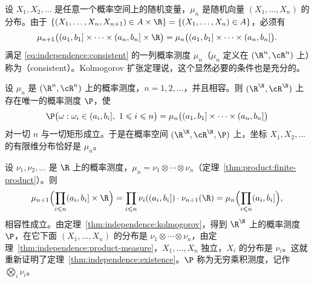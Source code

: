 设 $X_1,X_2,\dots$ 是任意一个概率空间上的随机变量，$\mu_n$ 是随机向量 $(X_1,\dots,X_n)$ 的分布。由于 $\{(X_1,\dots,X_n,X_{n+1})\in A\times\R\}=\{(X_1,\dots,X_n)\in A\}$，必须有
\begin{equation}\label{eq:independence:consistent}
\mu_{n+1}\bigl((a_1,b_1]\times\cdots\times(a_n,b_n]\times\R\bigr)=\mu_n\bigl((a_1,b_1]\times\cdots\times(a_n,b_n]\bigr).
\end{equation}
满足 \eqref{eq:independence:consistent} 的一列概率测度 $\mu_n$（$\mu_n$ 定义在 $(\R^n,\cR^n)$ 上）称为（consistent）。Kolmogorov 扩张定理说，这个显然必要的条件也是充分的。

\begin{theorem}\label{thm:independence:kolmogorov}
设 $\mu_n$ 是 $(\R^n,\cR^n)$ 上的概率测度，$n=1,2,\dots$，并且相容。则 $(\R^\N,\cR^\N)$ 上存在唯一的概率测度 $\P$，使
\[
\P\bigl(\omega:\omega_i\in(a_i,b_i],\ 1\leqslant i\leqslant n\bigr)=\mu_n\bigl((a_1,b_1]\times\cdots\times(a_n,b_n]\bigr)
\]
对一切 $n$ 与一切矩形成立。于是在概率空间 $(\R^\N,\cR^\N,\P)$ 上，坐标 $X_1,X_2,\dots$ 的有限维分布恰好是 $\mu_n$。
\end{theorem}

\begin{example}[独立序列]\label{ex:independence:kolmogorov-product}
设 $\nu_1,\nu_2,\dots$ 是 $\R$ 上的概率测度，$\mu_n=\nu_1\otimes\cdots\otimes\nu_n$（定理~\ref{thm:product:finite-product}）。则
\[
\mu_{n+1}\Bigl(\prod_{i\leqslant n}(a_i,b_i]\times\R\Bigr)=\prod_{i\leqslant n}\nu_i((a_i,b_i])\cdot\nu_{n+1}(\R)=\mu_n\Bigl(\prod_{i\leqslant n}(a_i,b_i]\Bigr),
\]
相容性成立。由定理~\ref{thm:independence:kolmogorov}，得到 $\R^\N$ 上的概率测度 $\P$，在它下面 $(X_1,\dots,X_n)$ 的分布是 $\nu_1\otimes\cdots\otimes\nu_n$，由定理~\ref{thm:independence:product-measure}，$X_1,\dots,X_n$ 独立，$X_i$ 的分布是 $\nu_i$。这就重新证明了定理~\ref{thm:independence:existence}。$\P$ 称为无穷乘积测度，记作 $\bigotimes_i\nu_i$。
\end{example}

